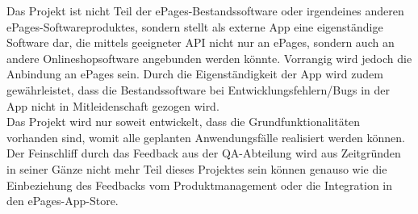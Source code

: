 Das Projekt ist nicht Teil der ePages-Bestandssoftware oder irgendeines anderen ePages-Softwareproduktes, sondern stellt als externe App eine eigenständige Software dar, die mittels geeigneter \acs{API} nicht nur an ePages, sondern auch an andere Onlineshopsoftware angebunden werden könnte. Vorrangig wird jedoch die Anbindung an ePages sein. Durch die Eigenständigkeit der App wird zudem gewährleistet, dass die Bestandssoftware bei Entwicklungsfehlern/Bugs in der App nicht in Mitleidenschaft gezogen wird. \\
Das Projekt wird nur soweit entwickelt, dass die Grundfunktionalitäten vorhanden sind, womit alle geplanten Anwendungsfälle realisiert werden können. Der Feinschliff durch das Feedback aus der \acs{QA}-Abteilung wird aus Zeitgründen in seiner Gänze nicht mehr Teil dieses Projektes sein können genauso wie die Einbeziehung des Feedbacks vom Produktmanagement oder die Integration in den ePages-App-Store.

